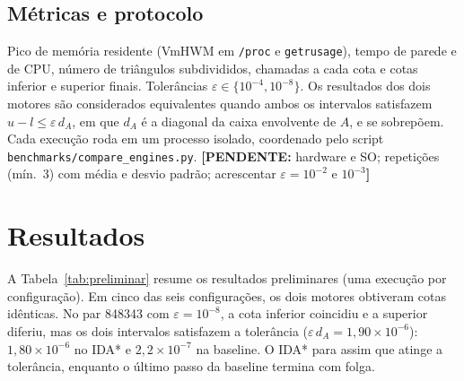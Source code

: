 \documentclass[9pt,a4paper,twocolumn]{extarticle}
\newif\ifmostrarorientacoes
\newcommand{\orientacao}[1]{%
  \ifmostrarorientacoes
    \par\smallskip
    \noindent\fcolorbox{black!35}{black!4}{%
      \parbox{0.94\columnwidth}{\fontsize{7.4}{8.2}\selectfont\textbf{Orientação aos autores:} #1}%
    }%
    \par\smallskip
  \fi
}
\newcommand{\pendente}[1]{{\color{red!70!black}\textbf{[PENDENTE:} #1\textbf{]}}}
\begin{document}
\subsection{Métricas e protocolo}
Pico de memória residente (VmHWM em \texttt{/proc} e \texttt{getrusage}), tempo de
parede e de CPU, número de triângulos subdivididos, chamadas a cada cota e cotas
inferior e superior finais. Tolerâncias $\varepsilon \in \{10^{-4}, 10^{-8}\}$.
Os resultados dos dois motores são considerados equivalentes quando ambos os
intervalos satisfazem $u - l \le \varepsilon\, d_A$, em que $d_A$ é a diagonal da
caixa envolvente de $A$, e se sobrepõem.
Cada execução roda em um processo isolado, coordenado pelo script
\texttt{benchmarks/compare\_engines.py}.
\pendente{hardware e SO; repetições (mín.\ 3) com média e desvio padrão;
acrescentar $\varepsilon = 10^{-2}$ e $10^{-3}$}

\section{Resultados}
\orientacao{Apresente resultados quantitativos e visuais. Toda tabela e figura deve ser
citada no texto e responder a uma questão experimental. Evite imagens meramente decorativas.}

A Tabela~\ref{tab:preliminar} resume os resultados preliminares (uma execução por
configuração). Em cinco das seis configurações, os dois motores obtiveram cotas
idênticas. No par 848343 com $\varepsilon = 10^{-8}$, a cota inferior coincidiu e a
superior diferiu, mas os dois intervalos satisfazem a tolerância
($\varepsilon\, d_A = 1{,}90\times10^{-6}$): $1{,}80\times10^{-6}$ no IDA* e
$2{,}2\times10^{-7}$ na baseline. O IDA* para assim que atinge a tolerância, enquanto
o último passo da baseline termina com folga.
\end{document}
